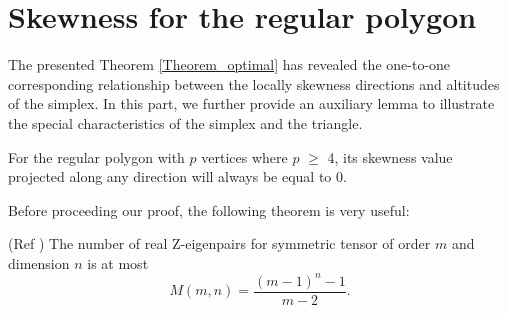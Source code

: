 \section{Skewness  for the regular polygon}\label{polygon}

The  presented  Theorem \ref{Theorem_optimal}  has revealed  the one-to-one  corresponding  relationship between the locally  skewness  directions  and  altitudes of the simplex. 
In  this part, we  further  provide  an  auxiliary  lemma to  illustrate  the  special characteristics  of  the simplex  and  the  triangle. 
 

\begin{lemma}\label{Theorem_ploygon}
	For  the  regular  polygon  with  $p$  vertices  where  $p$ $\ge$ 4,  its  skewness  value   projected  along any  direction  will  always be  equal to  0.  
\end{lemma}


Before  proceeding  our  proof,  the  following  theorem is  very  useful:
\setcounter{theorem}{3}
\begin{theorem}(Ref \cite{upperbound})\label{upperbound}
	The number of  real  Z-eigenpairs for  symmetric tensor  of order $m$ and dimension $ n $ is  at most
	\begin{equation}\label{at_most}
	M(m,n)=
	\frac {(m-1)^{n}-1}  {m-2}.
	\end{equation}
\end{theorem}









